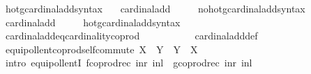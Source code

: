 \begin{isabellebody}
\isanewline
{}\isamarkupfalse%
\ hotg{\isacharunderscore}{\kern0pt}cardinal{\isacharunderscore}{\kern0pt}add{\isacharunderscore}{\kern0pt}syntax\ \ \isamarkupfalse%
\ cardinal{\isacharunderscore}{\kern0pt}add\ {\isacharparenleft}{\kern0pt}\ {\isachardoublequoteopen}{\isasymoplus}{\isachardoublequoteclose}\ {}{}{\isacharparenright}{\kern0pt}\ \isamarkupfalse%
\isanewline
{}\isamarkupfalse%
\ no{\isacharunderscore}{\kern0pt}hotg{\isacharunderscore}{\kern0pt}cardinal{\isacharunderscore}{\kern0pt}add{\isacharunderscore}{\kern0pt}syntax\ \ \isamarkupfalse%
\ cardinal{\isacharunderscore}{\kern0pt}add\ {\isacharparenleft}{\kern0pt}\ {\isachardoublequoteopen}{\isasymoplus}{\isachardoublequoteclose}\ {}{}{\isacharparenright}{\kern0pt}\ \isamarkupfalse%
\isanewline
{}\isamarkupfalse%
\ hotg{\isacharunderscore}{\kern0pt}cardinal{\isacharunderscore}{\kern0pt}add{\isacharunderscore}{\kern0pt}syntax\isanewline
\isanewline
{}\isamarkupfalse%
\ cardinal{\isacharunderscore}{\kern0pt}add{\isacharunderscore}{\kern0pt}eq{\isacharunderscore}{\kern0pt}cardinality{\isacharunderscore}{\kern0pt}coprod{\isacharcolon}{\kern0pt}\ {\isachardoublequoteopen}{\isasymkappa}\ {\isasymoplus}\ {\isasymmu}\ {\isacharequal}{\kern0pt}\ {\isacharbar}{\kern0pt}{\isasymkappa}\ {\isasymCoprod}\ {\isasymmu}{\isacharbar}{\kern0pt}{\isachardoublequoteclose}\isanewline
%
\isadelimproof
\ \ %
\endisadelimproof
%
\isatagproof
{}\isamarkupfalse%
\ cardinal{\isacharunderscore}{\kern0pt}add{\isacharunderscore}{\kern0pt}def\ \isacommand{{\isachardot}{\kern0pt}{\isachardot}{\kern0pt}}\isamarkupfalse%
%
\endisatagproof
{\isafoldproof}%
%
\isadelimproof
\isanewline
%
\endisadelimproof
\isanewline
{}\isamarkupfalse%
\ equipollent{\isacharunderscore}{\kern0pt}coprod{\isacharunderscore}{\kern0pt}self{\isacharunderscore}{\kern0pt}commute{\isacharcolon}{\kern0pt}\ {\isachardoublequoteopen}X\ {\isasymCoprod}\ Y\ {\isasymapprox}\ Y\ {\isasymCoprod}\ X{\isachardoublequoteclose}\isanewline
%
\isadelimproof
\ \ %
\endisadelimproof
%
\isatagproof
{}\isamarkupfalse%
\ {\isacharparenleft}{\kern0pt}intro\ equipollentI{\isacharbrackleft}{\kern0pt}\ {\isacharquery}{\kern0pt}f{\isacharequal}{\kern0pt}{\isachardoublequoteopen}coprod{\isacharunderscore}{\kern0pt}rec\ inr\ inl{\isachardoublequoteclose}\ \ {\isacharquery}{\kern0pt}g{\isacharequal}{\kern0pt}{\isachardoublequoteopen}coprod{\isacharunderscore}{\kern0pt}rec\ inr\ inl{\isachardoublequoteclose}{\isacharbrackright}{\kern0pt}{\isacharparenright}{\kern0pt}\isanewline

\end{isabellebody}
